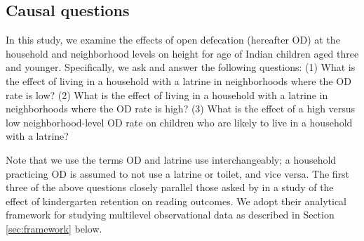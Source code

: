 \documentclass[12pt,a4paper,titlepage]{article}
\begin{document}

\subsection{Causal questions}
In this study, we examine the effects of open defecation (hereafter OD) at the household and neighborhood levels on height for age of Indian children aged three and younger. Specifically, we ask and answer the following questions: (1) What is the effect of living in a household with a latrine in neighborhoods where the OD rate is low? (2) What is the effect of living in a household with a latrine in neighborhoods where the OD rate is high? (3) What is the effect of a high versus low neighborhood-level OD rate on children who are likely to live in a household with a latrine?

Note that we use the terms OD and latrine use interchangeably; a household practicing OD is assumed to not use a latrine or toilet, and vice versa. The first three of the above questions closely parallel those asked by \cite{hong_raudenbush} in a study of the effect of kindergarten retention on reading outcomes. We adopt their analytical framework for studying multilevel observational data as described in Section \ref{sec:framework} below.
\end{document}
